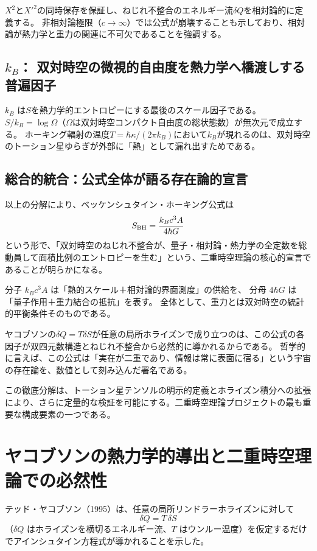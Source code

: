 \documentclass[dvipdfmx,a4paper]{jsbook}
\theoremstyle{definition}
\theoremstyle{remark}
\begin{document}
$X^2$と$X'^2$の同時保存を保証し、ねじれ不整合のエネルギー流$\delta Q$を相対論的に定義する。
非相対論極限（$c \to \infty$）では公式が崩壊することも示しており、相対論が熱力学と重力の関連に不可欠であることを強調する。

\subsection{$k_B$： 双対時空の微視的自由度を熱力学へ橋渡しする普遍因子}

$k_B$ は$S$を熱力学的エントロピーにする最後のスケール因子である。
$S / k_B = \log \Omega$（$\Omega$は双対時空コンパクト自由度の総状態数）が無次元で成立する。
ホーキング輻射の温度$T = \hbar \kappa / (2\pi k_B)$において$k_B$が現れるのは、双対時空のトーション星ゆらぎが外部に「熱」として漏れ出すためである。

\subsection{総合的統合：公式全体が語る存在論的宣言}

以上の分解により、ベッケンシュタイン・ホーキング公式は
\[
S_{\rm BH} = \frac{k_B c^3 A}{4 \hbar G}
\]
という形で、「双対時空のねじれ不整合が、量子・相対論・熱力学の全定数を総動員して面積比例のエントロピーを生む」という、二重時空理論の核心的宣言であることが明らかになる。

分子 $k_B c^3 A$ は「熱的スケール＋相対論的界面測度」の供給を、  
分母 $4 \hbar G$ は「量子作用＋重力結合の抵抗」を表す。  
全体として、重力とは双対時空の統計的平衡条件そのものである。

ヤコブソンの$\delta Q = T \delta S$が任意の局所ホライズンで成り立つのは、この公式の各因子が双四元数構造とねじれ不整合から必然的に導かれるからである。
哲学的に言えば、この公式は「実在が二重であり、情報は常に表面に宿る」という宇宙の存在論を、数値として刻み込んだ署名である。

この徹底分解は、トーション星テンソルの明示的定義とホライズン積分への拡張により、さらに定量的な検証を可能にする。二重時空理論プロジェクトの最も重要な構成要素の一つである。

\section{ヤコブソンの熱力学的導出と二重時空理論での必然性}

テッド・ヤコブソン（1995）は、任意の局所リンドラーホライズンに対して
\begin{equation}
  \delta Q = T \, \delta S
\end{equation}
（$\delta Q$ はホライズンを横切るエネルギー流、$T$ はウンルー温度）を仮定するだけでアインシュタイン方程式が導かれることを示した。
\end{document}
